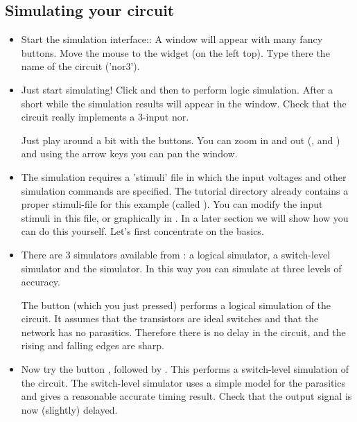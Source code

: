 \subsection{Simulating your circuit}
\label{simcircuit}
\begin{itemize}
\item
Start the simulation interface::
A window will appear with many fancy buttons. Move the mouse to the
widget  (on the left top). Type there the name of
the circuit ('nor3').

\item
Just start simulating! Click  and then
 to perform logic simulation.
After a short while the simulation results will appear in the window. Check
that the circuit really implements a 3-input nor.

Just play around a bit with the buttons. You can zoom in and out
(,  and ) and using the arrow
keys you can pan the window.

\item
The simulation requires a 'stimuli' file in which the input voltages and other
simulation commands are specified.  
The tutorial directory already contains a
proper stimuli-file for this example (called
). You can modify the input stimuli in this file, or
graphically in . In a later section we will show how you
can do this yourself. Let's first concentrate on the basics.
\item
There are 3 simulators available from : 
a logical simulator, a switch-level simulator and the 
simulator. In this way you can simulate at three levels of accuracy.

The button  (which you just pressed)
performs a
logical simulation of the circuit. It assumes that the transistors
are ideal switches and that the network has no parasitics. Therefore
there is no delay in the circuit, and the rising and falling edges
are sharp.

\item
Now try the button , followed by .
This performs a switch-level simulation of the circuit. The
switch-level simulator uses a simple model for the parasitics and
gives a reasonable accurate timing result. Check that the output
signal is now (slightly) delayed.


\end{itemize}
